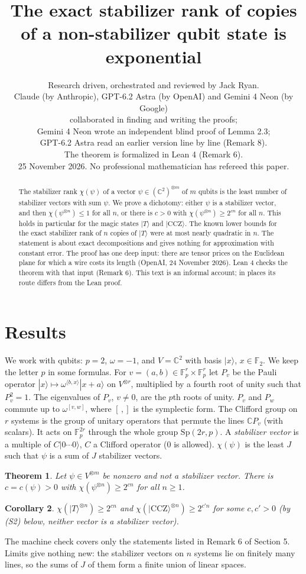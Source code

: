 \documentclass[11pt]{article}
\title{The exact stabilizer rank of copies of a non-stabilizer qubit state is exponential}
\author{Research driven, orchestrated and reviewed by Jack Ryan.\\ Claude (by Anthropic), GPT-6.2 Astra (by OpenAI) and Gemini 4 Neon (by Google)\\ collaborated in finding and writing the proofs;\\ Gemini 4 Neon wrote an independent blind proof of Lemma 2.3;\\ GPT-6.2 Astra read an earlier version line by line (Remark 8).\\ The theorem is formalized in Lean 4 (Remark 6).\\ 25 November 2026. No professional mathematician has refereed this paper.}
\date{}
\newtheorem{theorem}{Theorem}[section]
\newtheorem{corollary}[theorem]{Corollary}
\theoremstyle{definition}
\newcommand{\ket}[1]{|#1\rangle}
\newcommand{\C}{\mathbb C}
\newcommand{\F}{\mathbb F}
\begin{document}
\maketitle
\begin{abstract}
The stabilizer rank $\chi(\psi)$ of a vector $\psi\in(\C^2)^{\otimes m}$ of $m$ qubits is the least number of stabilizer vectors with sum $\psi$. We prove a dichotomy: either $\psi$ is a stabilizer vector, and then
$\chi(\psi^{\otimes n})\le1$ for all $n$, or there is $c>0$ with $\chi(\psi^{\otimes n})\ge2^{cn}$ for all $n$. This holds in particular for the magic states $\ket T$ and $\ket{\mathrm{CCZ}}$.
The known lower bounds for the exact stabilizer rank of $n$ copies of $\ket T$ were at most nearly quadratic in $n$. The statement is about exact decompositions and gives nothing for approximation with constant error.
The proof has one deep input: there are tensor prices on the Euclidean plane for which a wire costs its length (OpenAI, 24 November 2026).
Lean 4 checks the theorem with that input (Remark 6). This text is an informal account; in places its route differs from the Lean proof.
\end{abstract}

\section{Results}
We work with qubits: $p=2$, $\omega=-1$, and $V=\C^2$ with basis $\ket x$, $x\in\F_2$. We keep the letter $p$ in some formulas. For $v=(a,b)\in\F_p^r\times\F_p^r$ let $P_v$ be the Pauli operator $\ket x\mapsto\omega^{\langle b,x\rangle}\ket{x+a}$ on $V^{\otimes r}$, multiplied by a fourth root of unity such that $P_v^2=1$.
The eigenvalues of $P_v$, $v\ne0$, are the $p$th roots of unity. $P_v$ and $P_w$ commute up to $\omega^{[v,w]}$, where $[\,,]$ is the symplectic form. The Clifford group on $r$ systems is the group of unitary operators that permute the lines $\C P_v$ (with scalars).
It acts on $\F_p^{2r}$ through the whole group $\mathrm{Sp}(2r,p)$. A \emph{stabilizer vector} is a multiple of $C\ket{0\cdots0}$, $C$ a Clifford operator ($0$ is allowed). $\chi(\psi)$ is the least $J$ such that $\psi$ is a sum of $J$ stabilizer vectors.

\begin{theorem}\label{thm:main}
Let $\psi\in V^{\otimes m}$ be nonzero and not a stabilizer vector. There is $c=c(\psi)>0$ with $\chi(\psi^{\otimes n})\ge2^{cn}$ for all $n\ge1$.
\end{theorem}
\begin{corollary}
$\chi(\ket T^{\otimes n})\ge2^{cn}$ and $\chi(\ket{\mathrm{CCZ}}^{\otimes n})\ge2^{c'n}$ for some $c,c'>0$ (by (S2) below, neither vector is a stabilizer vector).
\end{corollary}
The machine check covers only the statements listed in Remark 6 of Section 5.
Limits give nothing new: the stabilizer vectors on $n$ systems lie on finitely many lines, so the sums of $J$ of them form a finite union of linear spaces.
\end{document}
